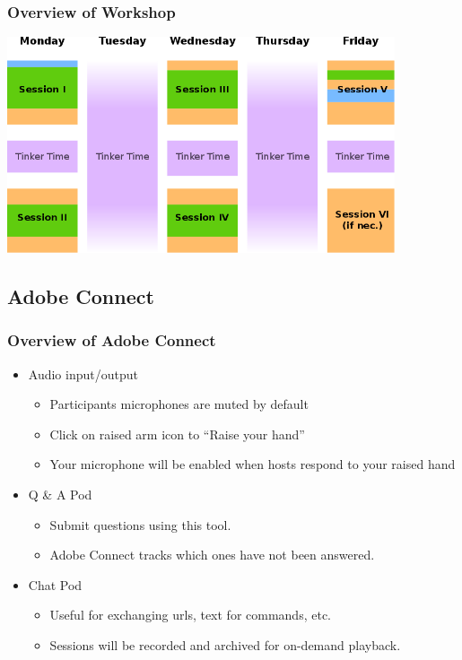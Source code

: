 \documentclass{beamer}
\begin{document}
\begin{frame}
  \frametitle{Overview of Workshop}
  
  \vfill
  \begin{center}
    \includegraphics[width=4.5in]{figs/overview}
  \end{center}  

\end{frame}


\subsection{Adobe Connect}

\begin{frame}
  \frametitle{Overview of Adobe Connect}
  \summary{}
 
  \begin{itemize}
  \item Audio input/output
    \begin{itemize}
    \item Participants microphones are muted by default
    \item Click on raised arm icon to ``Raise your hand''
    \item Your microphone will be enabled when hosts respond to your
      raised hand
    \end{itemize} 
  \item Q \& A Pod
    \begin{itemize}
    \item Submit questions using this tool.
    \item Adobe Connect tracks which ones have not been answered.
    \end{itemize}
  \item Chat Pod
    \begin{itemize}
    \item Useful for exchanging urls, text for commands, etc.
    \item Sessions will be recorded and archived for on-demand playback.
    \end{itemize}
  \end{itemize}

\end{frame}
\end{document}
